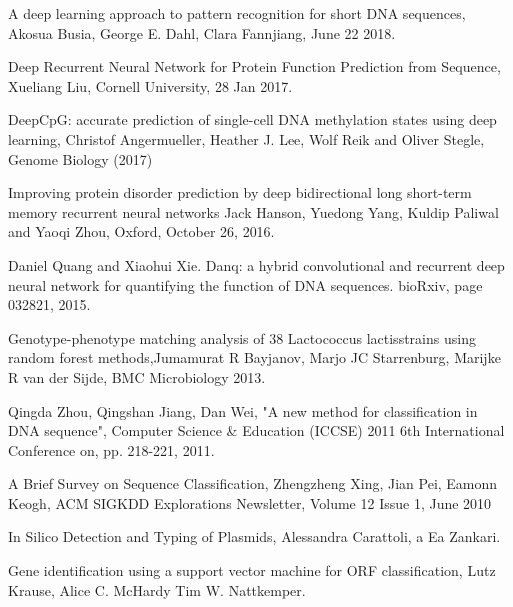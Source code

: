 \documentclass[conference]{IEEEtran}
\begin{document}
\begin{thebibliography}{10}
 A deep learning approach to pattern
recognition for short DNA sequences, Akosua Busia, George E. Dahl, Clara Fannjiang, June 22 2018.

 Deep Recurrent Neural Network for Protein Function Prediction from Sequence, Xueliang Liu, Cornell University, 28 Jan 2017.

 DeepCpG: accurate prediction of single-cell
DNA methylation states using deep learning, Christof Angermueller, Heather J. Lee, Wolf Reik and Oliver Stegle, Genome Biology (2017)

 Improving protein disorder prediction by deep
bidirectional long short-term memory recurrent neural networks
Jack Hanson, Yuedong Yang, Kuldip Paliwal and Yaoqi Zhou, Oxford, October 26, 2016.

 Daniel Quang and Xiaohui Xie. Danq: a hybrid convolutional and recurrent deep neural network for quantifying the function of DNA sequences. bioRxiv, page 032821, 2015.

 Genotype-phenotype matching analysis of 38 Lactococcus lactisstrains using random forest methods,Jumamurat R Bayjanov, Marjo JC Starrenburg, Marijke R van der Sijde,
BMC Microbiology 2013.

 Qingda Zhou, Qingshan Jiang, Dan Wei, "A new method for classification in DNA sequence", Computer Science \& Education (ICCSE) 2011 6th International Conference on, pp. 218-221, 2011.

 A Brief Survey on Sequence Classification, Zhengzheng Xing, Jian Pei, Eamonn Keogh, ACM SIGKDD Explorations Newsletter, Volume 12 Issue 1, June 2010

 In Silico Detection and Typing of Plasmids,  Alessandra Carattoli, a Ea Zankari.

 Gene identification using a support vector machine for ORF classification, Lutz Krause, Alice C. McHardy  Tim W. Nattkemper.

\end{thebibliography}
\vspace{12pt}
\end{document}
